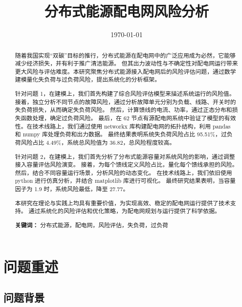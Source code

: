 \documentclass{article}
\title{分布式能源配电网风险分析}
\author{}
\date{\today}
\begin{document}
\maketitle

\begin{abstract}\label{sec:abstract}

  随着我国实现“双碳”目标的推行，分布式能源在配电网中的广泛应用成为必然，它能够减少经济损失，并有利于推广清洁能源。
  但其出力波动性与不确定性对配电网运行带来更大风险与评估难度。本研究聚焦分布式能源接入配电网后的风险评估问题，通过数学建模量化失负荷与过负荷风险，提出系统化的分析框架。

  针对问题 1，在建模上，我们首先构建了综合风险评估模型来描述系统运行的风险值。
  接着，独立分析不同节点的故障风险，通过分析故障单元分别为负载、线路、开关时的失负荷损失，从而确定失负荷风险。
  然后，计算馈线的电流、功率，通过正态分布和损失函数处理，确定过负荷风险。
  最后，在 62 节点有源配电网系统中验证了模型的有效性。在技术线路上，我们通过使用 networkx 库构建配电网的拓扑结构，利用 pandas 和 numpy 库处理负荷和出力数据。
  最终结果表明系统失负荷风险占比 95.51\%，过负荷风险占比 4.49\%，系统总风险值为 36.82，总风险程度较高。

  针对问题 2，在建模上，我们首先分析了分布式能源容量对系统风险的影响，通过调整接入容量评估风险演变。
  接着，为每个馈线定义风险占比，量化每个馈线承担的风险。
  然后，结合不同容量运行场景，分析风险的动态变化。
  在技术线路上，我们依旧使用 python 进行仿真分析，并结合 matplotlib 库进行可视化。
  最终研究结果表明，当容量因子为 1.9 时，系统风险最低，降至 27.77。

  本研究在理论与实践上均具有重要价值，为实现高效、稳定的配电网运行提供了技术支持。
  通过系统化的风险评估和优化策略，为配电网规划与运行提供了科学依据。

  \textbf{关键词：} 分布式能源，配电网，风险评估，失负荷，过负荷
\end{abstract}

\newpage

\section{问题重述}\label{sec:problem}

\subsection{问题背景}\label{sec:background}
\end{document}
